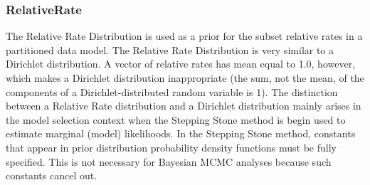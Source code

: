 \documentclass[10pt]{article}
\begin{document}
\subsubsection{RelativeRate}

The Relative Rate Distribution is used as a prior for the subset relative rates in a partitioned data model. The Relative Rate Distribution is very similar to a Dirichlet distribution. A vector of relative rates has mean equal to 1.0, however, which makes a Dirichlet distribution inappropriate (the sum, not the mean, of the components of a Dirichlet-distributed random variable is 1). The distinction between a Relative Rate distribution and a Dirichlet distribution mainly arises in the model selection context when the Stepping Stone method is begin used to estimate marginal (model) likelihoods. In the Stepping Stone method, constants that appear in prior distribution probability density functions must be fully specified. This is not necessary for Bayesian MCMC analyses because such constants cancel out.
\end{document}
